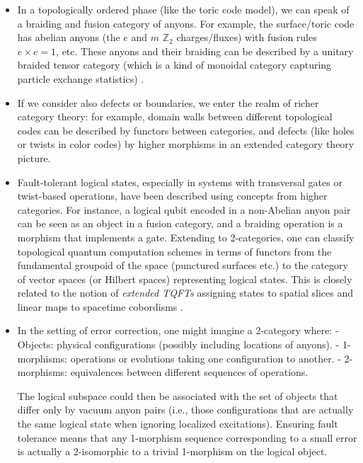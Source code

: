 \documentclass[11pt]{article}
\begin{document}
\begin{itemize}
    \item In a topologically ordered phase (like the toric code model), we can speak of a braiding and fusion category of anyons. For example, the surface/toric code has abelian anyons (the $e$ and $m$ $\mathbb{Z}_2$ charges/fluxes) with fusion rules $e \times e = 1$, etc. These anyons and their braiding can be described by a unitary braided tensor category (which is a kind of monoidal category capturing particle exchange statistics) \cite{Kitaev2006}.
    \item If we consider also defects or boundaries, we enter the realm of richer category theory: for example, domain walls between different topological codes can be described by functors between categories, and defects (like holes or twists in color codes) by higher morphisms in an extended category theory picture.
    \item Fault-tolerant logical states, especially in systems with transversal gates or twist-based operations, have been described using concepts from higher categories. For instance, a logical qubit encoded in a non-Abelian anyon pair can be seen as an object in a fusion category, and a braiding operation is a morphism that implements a gate. Extending to 2-categories, one can classify topological quantum computation schemes in terms of functors from the fundamental groupoid of the space (punctured surfaces etc.) to the category of vector spaces (or Hilbert spaces) representing logical states. This is closely related to the notion of \emph{extended TQFTs} assigning states to spatial slices and linear maps to spacetime cobordisms \cite{Walker2012}.
    \item In the setting of error correction, one might imagine a 2-category where:
        - Objects: physical configurations (possibly including locations of anyons).
        - 1-morphisms: operations or evolutions taking one configuration to another.
        - 2-morphisms: equivalences between different sequences of operations.
        
        The logical subspace could then be associated with the set of objects that differ only by vacuum anyon pairs (i.e., those configurations that are actually the same logical state when ignoring localized excitations). Ensuring fault tolerance means that any 1-morphism sequence corresponding to a small error is actually a 2-isomorphic to a trivial 1-morphism on the logical object.
\end{itemize}
\end{document}
